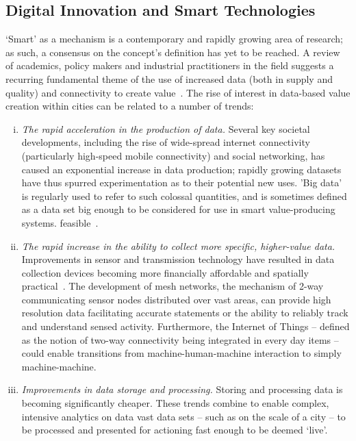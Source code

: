 \documentclass[b5paper,10pt]{article}
\begin{document}
\subsection{Digital Innovation and Smart Technologies}

`Smart' as a mechanism is a contemporary and rapidly growing area of
research; as such, a consensus on the concept's definition has yet to
be reached. A review of academics, policy makers and industrial
practitioners in the field suggests a recurring fundamental theme of
the use of increased data (both in supply and quality) and
connectivity to create
value~\citep{komninos:2002,arup-et-al:2011,harrison+abbottdonnelly:2011,batty-et-al:2012,buscher:2014}. The
rise of interest in data-based value creation within cities can be
related to a number of trends:

\begin{enumerate}[i)]
\item {\emph{The rapid acceleration in the production of data.}}
Several key societal developments, including the rise of wide-spread
internet connectivity (particularly high-speed mobile connectivity)
and social networking, has caused an exponential increase in data
production; rapidly growing datasets have thus spurred experimentation
as to their potential new uses. 'Big data' is regularly used to refer
to such colossal quantities, and is sometimes defined as a data set
big enough to be considered for use in smart value-producing
systems. feasible~\citep{hollands:2008,ibmsmartcities:2009,ciscoconcities:2010}.
\item {\emph{The rapid increase in the ability to collect more
specific, higher-value data.}} Improvements in sensor and transmission
technology have resulted in data collection devices becoming more
financially affordable and spatially
practical~\citep{townsend:2013}. The development of mesh networks, the
mechanism of 2-way communicating sensor nodes distributed over vast
areas, can provide high resolution data facilitating accurate
statements or the ability to reliably track and understand sensed
activity. Furthermore, the Internet of Things -- defined as the notion
of two-way connectivity being integrated in every day items -- could
enable transitions from machine-human-machine interaction to simply
machine-machine.
\item {\emph{Improvements in data storage and processing.}}  Storing
and processing data is becoming significantly cheaper. These trends
combine to enable complex, intensive analytics on data vast data sets
-- such as on the scale of a city -- to be processed and presented for
actioning fast enough to be deemed `live'.
\end{enumerate}
\end{document}
